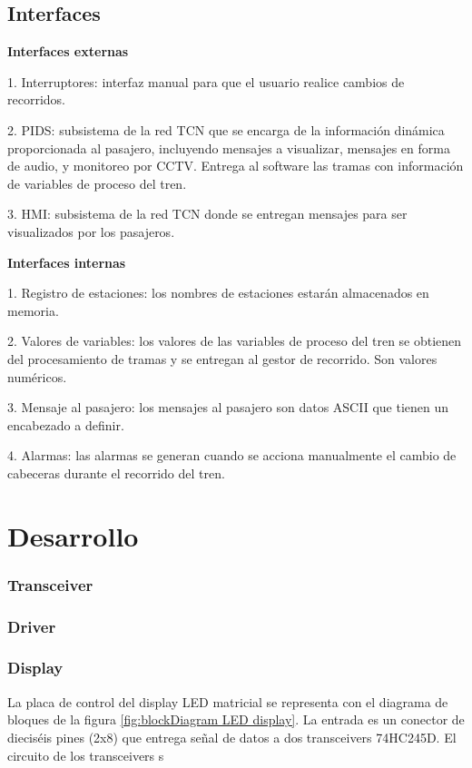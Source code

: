 \documentclass[
11pt, %
]{charter}
\begin{document}
\pagebreak
\subsection{Interfaces}
\textbf{Interfaces externas}

1. Interruptores: interfaz manual para que el usuario realice cambios de recorridos.

2. PIDS: subsistema de la red TCN que se encarga de la información dinámica proporcionada al pasajero, incluyendo mensajes a visualizar, mensajes en forma de audio, y monitoreo por CCTV. Entrega al software las tramas con información de variables de proceso del tren.

3. HMI: subsistema de la red TCN donde se entregan mensajes para ser visualizados por
los pasajeros.

\textbf{Interfaces internas}

1. Registro de estaciones: los nombres de estaciones estarán almacenados en memoria.

2. Valores de variables: los valores de las variables de proceso del tren se obtienen del procesamiento de tramas y se entregan al gestor de recorrido. Son valores numéricos.

3. Mensaje al pasajero: los mensajes al pasajero son datos ASCII que tienen un encabezado a definir.

4. Alarmas: las alarmas se generan cuando se acciona manualmente el cambio de cabeceras durante el recorrido del tren.




\pagebreak
\section{Desarrollo}


\subsubsection{Transceiver}
\pagebreak

\subsubsection{Driver}
\pagebreak

\subsubsection{Display}
La placa de control del display LED matricial se representa con el diagrama de bloques de la figura \ref{fig:blockDiagram LED display}. La entrada es un conector de dieciséis pines (2x8) que entrega señal de datos a dos transceivers 74HC245D. El circuito de los transceivers s
\end{document}
